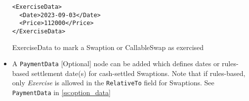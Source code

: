 \begin{itemize}
 \begin{listing}[H]
\begin{verbatim}
<ExerciseData>
  <Date>2023-09-03</Date>
  <Price>112000</Price>
</ExerciseData>
\end{verbatim}
\caption{ExerciseData to mark a Swaption or CallableSwap as exercised}
\label{lst:exercise_data}
\end{listing}
  
\item A \lstinline!PaymentData! [Optional] node can be added which defines dates or rules-based settlement date(s) for cash-settled Swaptions.  Note that if rules-based, only \emph{Exercise} is allowed in the \lstinline!RelativeTo! field for Swaptions. See  \lstinline!PaymentData! in \ref{ss:option_data}


\end{itemize}



